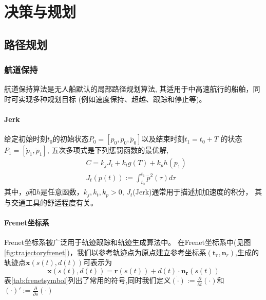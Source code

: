 
\chapter{决策与规划}
\label{chap:chapter04}


\section{路径规划}
\label{sec:pathplanning}
\subsection{航道保持}
航道保持算法是无人船默认的局部路径规划算法, 其适用于中高速航行的船舶，同时可实现多种规划目标
(例如速度保持、超越、跟踪和停止等)。
\subsubsection{Jerk}
\begin{theorem}
\label{thm:jerktheorem}
给定初始时刻$t_0$的初始状态$P_0=[p_0, \dot{p}_0,\ddot{p}_0]$以及结束时刻$t_1= t_0+T$
的状态$P_1=[ \dot{p}_1,\ddot{p}_1]$, 五次多项式是下列惩罚函数的最优解,
\begin{equation}
  \begin{aligned}
    &C=k_j J_t + k_t g(T) + k_p h(p_1) \\
    &J_t(p(t)):=\int_{t_0}^{t_1} \dddot{p}^2(\tau) d \tau
  \end{aligned}
\end{equation}
其中，$g$和$h$是任意函数，$k_j, k_t, k_p>0$, $J_t$(Jerk)通常用于描述加加速度的积分，
其与交通工具的舒适程度有关。
\end{theorem}

\subsubsection{Frenet坐标系}
Frenet坐标系被广泛用于轨迹跟踪和轨迹生成算法中\cite{werling2010optimal}。
在Frenet坐标系中(见图\ref{fig:trajectoryfrenet})，我们以参考轨迹点为原点建立参考坐标系$(\bm{t}_r, \bm{n}_r)$,生成的轨迹点$\bm{x}(s(t),d(t))$可表示为
\begin{equation}
  \label{eq:frenetcoordinate}
  \bm{x}(s(t),d(t)) = \bm{r}(s(t)) + d(t) \cdot \bm{n_r}(s(t))
\end{equation}
表\ref{tab:frenetsymbol}列出了常用的符号,同时我们定义$\dot{(\cdot)}:=
\frac{\partial}{\partial t}(\cdot)$和$(\cdot)':=
\frac{\partial}{\partial s}(\cdot)$

